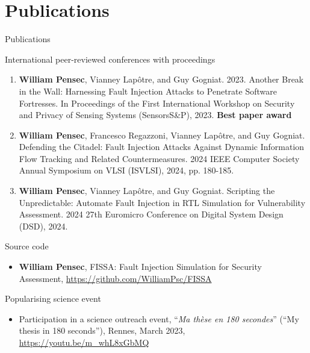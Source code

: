 \section*{Publications}

\begin{frame}[allowframebreaks]{Publications}
    \begin{block}{International peer-reviewed conferences with proceedings}
        \begin{enumerate}
            \item {\footnotesize\textbf{William Pensec}, Vianney Lapôtre, and Guy Gogniat. 2023. Another Break in the Wall: Harnessing Fault Injection Attacks to Penetrate Software Fortresses. In Proceedings of the First International Workshop on Security and Privacy of Sensing Systems (SensorsS\&P), 2023. \textbf{Best paper award}~\cite{PLG-23-SensorsSP}}
            \item {\footnotesize\textbf{William Pensec}, Francesco Regazzoni, Vianney Lapôtre, and Guy Gogniat. Defending the Citadel: Fault Injection Attacks Against Dynamic Information Flow Tracking and Related Countermeasures. 2024 IEEE Computer Society Annual Symposium on VLSI (ISVLSI), 2024, pp. 180-185.~\cite{PRLG-24-isvlsi}}
            \item {\footnotesize\textbf{William Pensec}, Vianney Lapôtre, and Guy Gogniat. Scripting the Unpredictable: Automate Fault Injection in RTL Simulation for Vulnerability Assessment. 2024 27th Euromicro Conference on Digital System Design (DSD), 2024.~\cite{PLG-24-dsd}}
        \end{enumerate}
    \end{block}

    \begin{block}{Source code}
        \begin{itemize}
            \item {\footnotesize \textbf{William Pensec}, FISSA: Fault Injection Simulation for Security Assessment, \url{https://github.com/WilliamPsc/FISSA}}
        \end{itemize}
    \end{block}

    \begin{block}{Popularising science event}
        \begin{itemize}
            \item {\footnotesize Participation in a science outreach event, “\textit{Ma thèse en 180 secondes}” (“My thesis in 180 seconds”), Rennes, March 2023, \url{https://youtu.be/m_whL8xGbMQ}}
        \end{itemize}
    \end{block}
\end{frame}
\begin{frame}{}
    \backpage
\end{frame}
